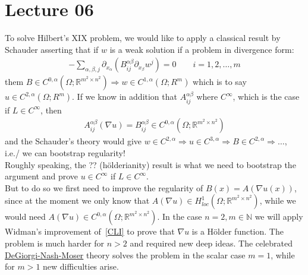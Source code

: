 \chapter{Lecture 06}

To solve Hilbert's XIX problem, we would like to apply a classical result by Schauder asserting that if \( w \) is a weak solution if a problem in divergence form:
\begin{gather}
	- \sum\limits_{\alpha ,\beta ,j}^{} \partial_{x_{\alpha }} \left( B_{ij}^{\alpha \beta } \partial_{x_{\beta }} w^{j} \right) = 0\qquad i = 1,2,\ldots,m
\end{gather}
them \( B \in  C^{0, \alpha }(\Omega ; \mathbb{R}^{m^{2} \times n^{2}}) \Rightarrow w \in C^{1, \alpha }(\Omega ; R^{m}) \) which is to say \( u \in C^{2, \alpha }(\Omega ; R^{m}) \). If we know in addition that \( A_{ij}^{\alpha \beta } \) where \( C^{\infty } \), which is the case if \( L \in  C^{\infty } \), then
\begin{gather}
	A_{ij}^{\alpha \beta }(\nabla u) = B_{ij}^{\alpha \beta } \in C^{0, \alpha }(\Omega ; \mathbb{R}^{m^{2} \times n^{2}})
\end{gather}
and the Schauder's theory would give \( w \in C^{2, \alpha } \Rightarrow u \in C^{3, \alpha } \Rightarrow B \in C^{2, \alpha } \Rightarrow \ldots \), i.e./ we can bootstrap regularity! \\
Roughly speaking, the ?? (hölderianity) result is what we need to bootstrap the argument and prove \( u \in  C^{\infty } \) if \( L \in C^{\infty } \). \\
But to do so we first need to improve the regularity of \( B(x) = A(\nabla u(x))	\), since at the moment we only know that \( A(\nabla u ) \in H_{loc}^{1}(\Omega ; \mathbb{R}^{m^{2} \times n^{2}}) \), while we would need \( A(\nabla u ) \in C^{0, \alpha }(\Omega ; \mathbb{R}^{m^{2} \times n^{2}})  \). In the case \( n=2, m \in  \mathbb{N} \) we will apply Widman's improvement of~\eqref{CLI} to prove that \( \nabla u \) is a Hölder function. The problem is much harder for \( n >2 \) and required new deep ideas. The celebrated \underline{DeGiorgi-Nash-Moser} theory solves the problem in the scalar case \( m=1 \), while for \( m >1 \) new difficulties arise.
